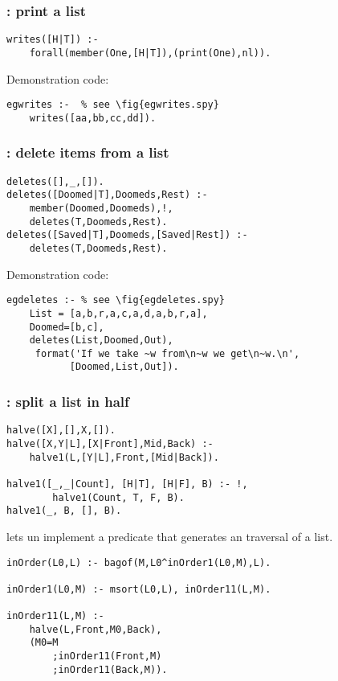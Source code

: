 \subsubsection{ : print a list 
}
\label{sec:writes/1}
\begin{Verbatim}
writes([H|T]) :- 
    forall(member(One,[H|T]),(print(One),nl)).
\end{Verbatim}
 Demonstration code: 
\begin{Verbatim}
egwrites :-  % see \fig{egwrites.spy}
    writes([aa,bb,cc,dd]).
\end{Verbatim}
\subsubsection{ :  delete items from a list 
}
\label{sec:deletes/3}
\begin{Verbatim} 
deletes([],_,[]).
deletes([Doomed|T],Doomeds,Rest) :- 
    member(Doomed,Doomeds),!,
    deletes(T,Doomeds,Rest).
deletes([Saved|T],Doomeds,[Saved|Rest]) :-
    deletes(T,Doomeds,Rest).
\end{Verbatim}
 Demonstration code: 
\begin{Verbatim}
egdeletes :- % see \fig{egdeletes.spy}
    List = [a,b,r,a,c,a,d,a,b,r,a],
    Doomed=[b,c],
    deletes(List,Doomed,Out),
     format('If we take ~w from\n~w we get\n~w.\n',
           [Doomed,List,Out]).
\end{Verbatim}
\subsubsection{ : split a list in half
}
\begin{Verbatim}
halve([X],[],X,[]).
halve([X,Y|L],[X|Front],Mid,Back) :-
	halve1(L,[Y|L],Front,[Mid|Back]).

halve1([_,_|Count], [H|T], [H|F], B) :- !,
        halve1(Count, T, F, B).
halve1(_, B, [], B).
\end{Verbatim}
 lets un implement a predicate
that generates an  traversal of a list.
\begin{Verbatim}
inOrder(L0,L) :- bagof(M,L0^inOrder1(L0,M),L).

inOrder1(L0,M) :- msort(L0,L), inOrder11(L,M).

inOrder11(L,M) :-
	halve(L,Front,M0,Back),
	(M0=M
        ;inOrder11(Front,M)
        ;inOrder11(Back,M)).
\end{Verbatim}
